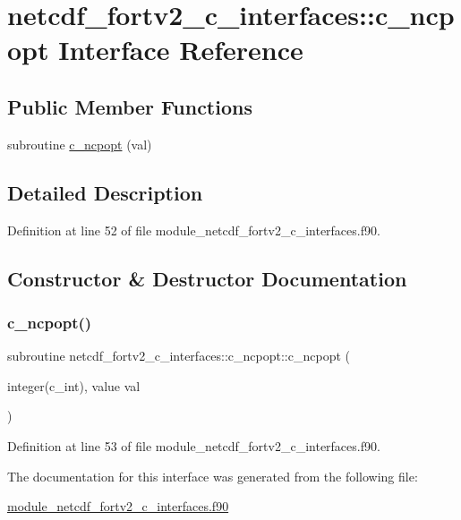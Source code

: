\hypertarget{interfacenetcdf__fortv2__c__interfaces_1_1c__ncpopt}{}\section{netcdf\+\_\+fortv2\+\_\+c\+\_\+interfaces\+:\+:c\+\_\+ncpopt Interface Reference}
\label{interfacenetcdf__fortv2__c__interfaces_1_1c__ncpopt}
\subsection*{Public Member Functions}
\begin{DoxyCompactItemize}
\item 
subroutine \hyperlink{interfacenetcdf__fortv2__c__interfaces_1_1c__ncpopt_a572dbedc4931dfb47b840d162cbec293}{c\+\_\+ncpopt} (val)
\end{DoxyCompactItemize}


\subsection{Detailed Description}


Definition at line 52 of file module\+\_\+netcdf\+\_\+fortv2\+\_\+c\+\_\+interfaces.\+f90.



\subsection{Constructor \& Destructor Documentation}
\mbox{\label{interfacenetcdf__fortv2__c__interfaces_1_1c__ncpopt_a572dbedc4931dfb47b840d162cbec293}} 
\subsubsection{\texorpdfstring{c\+\_\+ncpopt()}{c\_ncpopt()}}
{\footnotesize\ttfamily subroutine netcdf\+\_\+fortv2\+\_\+c\+\_\+interfaces\+::c\+\_\+ncpopt\+::c\+\_\+ncpopt (\begin{DoxyParamCaption}\item[{integer(c\+\_\+int), value}]{val }\end{DoxyParamCaption})}



Definition at line 53 of file module\+\_\+netcdf\+\_\+fortv2\+\_\+c\+\_\+interfaces.\+f90.



The documentation for this interface was generated from the following file\+:\begin{DoxyCompactItemize}
\item 
\hyperlink{module__netcdf__fortv2__c__interfaces_8f90}{module\+\_\+netcdf\+\_\+fortv2\+\_\+c\+\_\+interfaces.\+f90}\end{DoxyCompactItemize}
